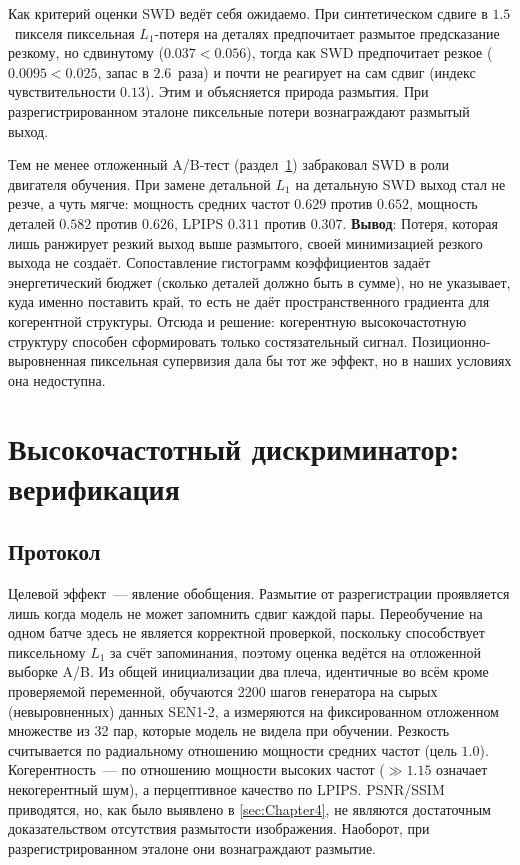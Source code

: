 Как критерий оценки SWD ведёт себя ожидаемо. При синтетическом сдвиге в
$1.5$~пикселя пиксельная $L_{1}$-потеря на деталях предпочитает размытое
предсказание резкому, но сдвинутому ($0.037 < 0.056$), тогда как SWD предпочитает
резкое ($0.0095 < 0.025$, запас в $2.6$~раза) и почти не реагирует на сам сдвиг
(индекс чувствительности $0.13$). Этим и объясняется природа размытия. При
разрегистрированном эталоне пиксельные потери вознаграждают размытый выход.

Тем не менее отложенный A/B-тест (раздел~\ref{sec:hfd}) забраковал SWD
в роли двигателя обучения. При замене детальной $L_{1}$ на детальную SWD выход стал
не резче, а чуть мягче: мощность средних частот $0.629$ против $0.652$, мощность
деталей $0.582$ против $0.626$, LPIPS $0.311$ против $0.307$.
\textbf{Вывод}: Потеря,
которая лишь ранжирует резкий выход выше размытого, своей минимизацией резкого выхода
не создаёт. Сопоставление гистограмм коэффициентов задаёт энергетический бюджет
(сколько деталей должно быть в сумме), но не указывает, куда именно поставить край,
то есть не даёт пространственного градиента для когерентной структуры. Отсюда и
решение: когерентную высокочастотную структуру способен сформировать только
состязательный сигнал. Позиционно-выровненная пиксельная супервизия дала бы тот же
эффект, но в наших условиях она недоступна.

\section{Высокочастотный дискриминатор: верификация}
\label{sec:hfd}

\subsection{Протокол}

Целевой эффект~--- явление обобщения. Размытие от разрегистрации проявляется
лишь когда модель не может запомнить сдвиг каждой пары. Переобучение на одном
батче здесь не является корректной проверкой, поскольку способствует пиксельному $L_{1}$ за счёт
запоминания, поэтому оценка ведётся на отложенной выборке A/B. Из общей
инициализации два плеча, идентичные во всём кроме проверяемой переменной,
обучаются 2200 шагов генератора на сырых (невыровненных) данных SEN1-2, а
измеряются на фиксированном отложенном множестве из 32 пар, которые модель не видела при
обучении. Резкость считывается по радиальному отношению мощности средних частот
(цель $1.0$). Когерентность~--- по отношению мощности высоких частот ($\gg 1.15$
означает некогерентный шум), а перцептивное качество по LPIPS. PSNR/SSIM
приводятся, но, как было выявлено в \ref{sec:Chapter4}, не являются достаточным доказательством отсутствия размытости изображения.
Наоборот, при разрегистрированном эталоне они вознаграждают размытие.

